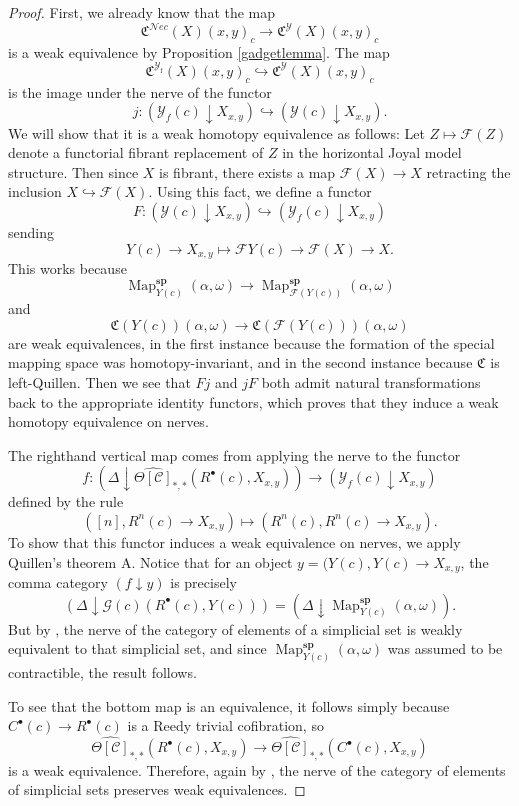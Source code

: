 \documentclass{amsart}
\numberwithin{equation}{section}
\theoremstyle{plain}   %
\theoremstyle{remark}
\theoremstyle{plain}
\newcommand{\Nec}{\ensuremath{{\mathcal{N}ec}}}
\newcommand{\overcat}[2]{{\left(#1\downarrow #2\right)}}
\DeclareMathOperator{\Map}{Map}
\newcommand{\cellset}{\ensuremath{\widehat{\Theta[\mathcal{C}]}}}
\begin{document}
\begin{proof}
	First, we already know that the map
	\[\mathfrak{C}^\Nec(X)(x,y)_c \to \mathfrak{C}^\mathcal{Y}(X)(x,y)_c\]
	is a weak equivalence by Proposition \ref{gadgetlemma}.  The map
	\[\mathfrak{C}^{\mathcal{Y}_\mathrm{f}}(X)(x,y)_c \hookrightarrow \mathfrak{C}^{\mathcal{Y}}(X)(x,y)_c\]
	is the image under the nerve of the functor
	\[j:\overcat{\mathcal{Y}_f(c)}{X_{x,y}} \hookrightarrow \overcat{\mathcal{Y}(c)}{X_{x,y}}.\]
	We will show that it is a weak homotopy equivalence as follows: Let \(Z\mapsto \mathscr{F}(Z)\) denote a functorial fibrant replacement of \(Z\) in the horizontal Joyal model structure. Then since \(X\) is fibrant, there exists a map \(\mathscr{F}(X)\to X\) retracting the inclusion \(X\hookrightarrow \mathscr{F}(X)\).  Using this fact, we define a functor
	\[F:\overcat{\mathcal{Y}(c)}{X_{x,y}} \hookrightarrow \overcat{\mathcal{Y}_f(c)}{X_{x,y}}\]
	sending \[Y(c)\to X_{x,y} \mapsto \mathscr{F}Y(c)\to \mathscr{F}(X) \to X.\]
	This works because
	\[\Map^\mathbf{sp}_{Y(c)}(\alpha,\omega)\to \Map^\mathbf{sp}_{\mathscr{F}(Y(c))}(\alpha,\omega)\]
	and
	\[\mathfrak{C}(Y(c))(\alpha,\omega)\to \mathfrak{C}(\mathscr{F}(Y(c)))(\alpha,\omega)\]
	are weak equivalences, in the first instance because the formation of the special mapping space was homotopy-invariant, and in the second instance because \(\mathfrak{C}\) is left-Quillen. Then we see that \(Fj\) and \(jF\) both admit natural transformations back to the appropriate identity functors, which proves that they induce a weak homotopy equivalence on nerves.

	The righthand vertical map comes from applying the nerve to the functor
	\[f:\overcat{\Delta}{\cellset_{\ast,\ast}(R^\bullet(c),X_{x,y})} \to \overcat{\mathcal{Y}_f(c)}{X_{x,y}}\]
	defined by the rule
	\[([n],R^n(c) \to X_{x,y}) \mapsto (R^n(c), R^n(c)\to X_{x,y}).\]
	To show that this functor induces a weak equivalence on nerves, we apply Quillen's theorem A.  Notice that for an object \(y=(Y(c),Y(c)\to X_{x,y}\), the comma category \(\overcat{f}{y}\) is precisely
	\[\overcat{\Delta}{\mathcal{G}(c)(R^\bullet(c),Y(c))}=\overcat{\Delta}{\Map^\mathbf{sp}_{Y(c)}(\alpha,\omega)}.\]
	But by \cite{ds2}, the nerve of the category of elements of a simplicial set is weakly equivalent to that simplicial set, and since \(\Map^\mathbf{sp}_{Y(c)}(\alpha,\omega)\) was assumed to be contractible, the result follows.

	To see that the bottom map is an equivalence, it follows simply because \(C^\bullet(c) \to R^\bullet(c)\) is a Reedy trivial cofibration, so
	\[\cellset_{\ast,\ast}(R^\bullet(c),X_{x,y})  \to \cellset_{\ast,\ast}(C^\bullet(c),X_{x,y})\]
	is a weak equivalence.  Therefore, again by \cite{ds2}, the nerve of the category of elements of simplicial sets preserves weak equivalences.
\end{proof}
\end{document}
